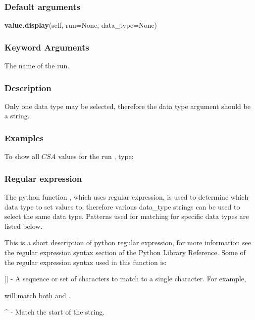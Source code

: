 \subsubsection{Default arguments}

\textsf{\textbf{value.display}(self, run=None, data\_type=None)}


\subsubsection{Keyword Arguments}

  The name of the run.


\subsubsection{Description}

Only one data type may be selected, therefore the data type argument should be a string.


\subsubsection{Examples}

To show all $CSA$ values for the run 
, type:






\subsubsection{Regular expression}

The python function 
, which uses regular expression, is used to determine which data
type to set values to, therefore various data\_type strings can be used to select the same
data type.  Patterns used for matching for specific data types are listed below.

This is a short description of python regular expression, for more information see the
regular expression syntax section of the Python Library Reference.  Some of the regular
expression syntax used in this function is:

    [] - A sequence or set of characters to match to a single character.  For example,
    
 will match both 
 and 
.

    \^{} - Match the start of the string.

